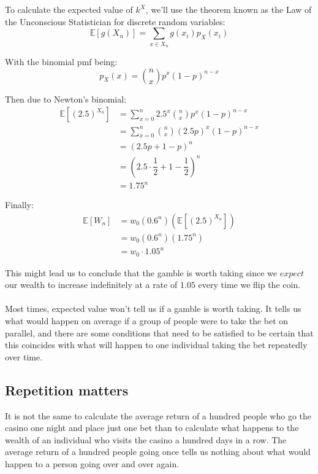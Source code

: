 \documentclass[12pt]{article}
\begin{document}
To calculate the expected value of $k^X$, we'll use the theorem known as the Law of the Unconscious Statistician for discrete random variables:
\begin{equation}
    \mathbb{E}[g(X_n)] = \sum\limits_{x \in X_n} g(x_i) p_X(x_i)
\end{equation}

With the binomial pmf being:
\begin{equation}
    p_X(x) = {n \choose x} p^x (1-p)^{n-x}
\end{equation}

Then due to Newton's binomial:
\begin{equation*}
  \begin{split}
    \mathbb{E}[(2.5)^{X_n}] &= \sum\limits_{x=0}^{n} 2.5^x {n \choose x} p^x (1-p)^{n-x}\\
    &= \sum\limits_{x=0}^{n} {n \choose x} (2.5p)^x (1-p)^{n-x}\\
    &= (2.5p + 1 - p)^n \\ 
    &= (2.5 \cdot \dfrac{1}{2} + 1 - \dfrac{1}{2})^n\\
    & = 1.75^n
  \end{split}
\end{equation*}

Finally:
\begin{equation*}
  \begin{split}
    \mathbb{E}[W_n] &= w_0 \left(0.6^n\right) \left(\mathbb{E}[(2.5)^{X_n}]\right)\\
    &= w_0 \left(0.6^n\right) \left(1.75^n\right)\\
    &= w_0 \cdot 1.05^n
  \end{split}
\end{equation*}

This might lead us to conclude that the gamble is worth taking since we $expect$ our wealth to increase indefinitely at a rate of $1.05$ every time we flip the coin.
\\\\
Most times, expected value won't tell us if a gamble is worth taking. It tells us what would happen on average if a group of people were to take the bet on parallel, and there are some conditions that need to be satisfied to be certain that this coincides with what will happen to one individual taking the bet repeatedly over time.

\subsection{Repetition matters}
It is not the same to calculate the average return of a hundred people who go the casino one night and place just one bet than to calculate what happens to the wealth of an individual who visits the casino a hundred days in a row. The average return of a hundred people going once tells us nothing about what would happen to a person going over and over again.
\end{document}
